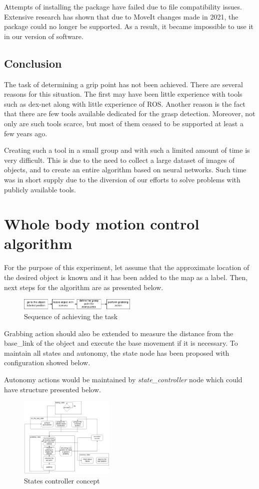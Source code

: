 \documentclass[conference,a4paper]{IEEEtran}
\begin{document}
Attempts of installing the package have failed due to file compatibility issues. Extensive research has shown that due to MoveIt changes made in 2021, the package could no longer be supported. As a result, it became impossible to use it in our version of software.

\subsection{Conclusion}
The task of determining a grip point has not been achieved. There are several reasons for this situation. The first may have been little experience with tools such as dex-net along with little experience of ROS. Another reason is the fact that there are few tools available dedicated for the grasp detection. Moreover, not only are such tools scarce, but most of them ceased to be supported at least a few years ago.

Creating such a tool in a small group and with such a limited amount of time is very difficult. This is due to the need to collect a large dataset of images of objects, and to create an entire algorithm based on neural networks. Such time was in short supply due to the diversion of our efforts to solve problems with publicly available tools. 

\section{Whole body motion control algorithm}
For the purpose of this experiment, let assume that the approximate location of the desired object is known and it has been added to the map as a label. Then, next steps for the algorithm are as presented below.

\begin{figure}[ht]
  \centering
  \includegraphics[width=0.5\textwidth]{img/algorithm_no_problem1.png}
  \caption{Sequence of achieving the task}
\end{figure}

Grabbing action should also be extended to measure the distance from the base\_link of the object and execute the base movement if it is necessary. To maintain all states and autonomy, the state node has been proposed with configuration showed below.

Autonomy actions would be maintained by \textit{state\_controller} node which could have structure presented below.
\begin{figure}[ht]
  \centering
  \includegraphics[width=0.4\textwidth]{img/states.png}
  \caption[states controller structure]{States controller concept}
\end{figure}
\FloatBarrier
\end{document}
